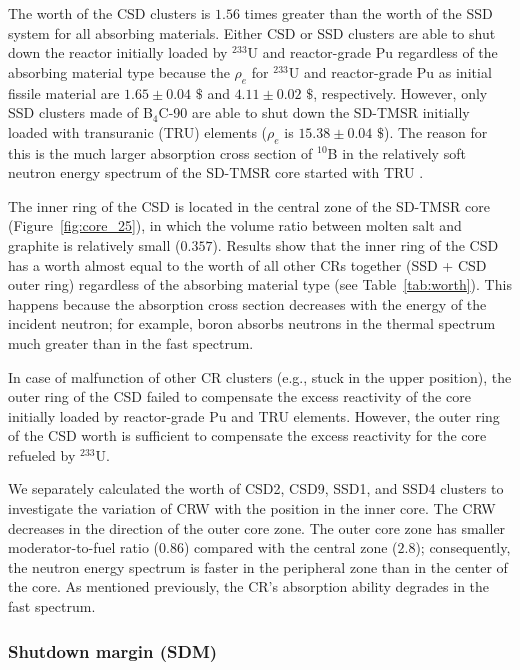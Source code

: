The worth of the CSD clusters is $1.56$ times greater than 
the worth of the SSD system for all absorbing materials. Either CSD or SSD 
clusters are able to shut down the reactor initially loaded by 
$^{233}$U and reactor-grade Pu regardless of the absorbing material type because 
the $\rho_e$ for $^{233}$U and reactor-grade Pu as initial fissile material are $1.65\pm0.04$ 
$\$$ and $4.11\pm0.02$ $\$$, respectively. However, only SSD clusters made of B$_4$C-90 are able to shut down the SD-TMSR 
initially loaded with transuranic (TRU) elements ($\rho_e$ is $15.38\pm0.04$ $\$$). The reason for this is the much larger 
absorption cross section of $^{10}$B in the relatively soft neutron energy 
spectrum of the SD-TMSR core started with TRU \cite{ashraf2020Strategies}.

The inner ring of the CSD is located in the central zone of the SD-TMSR core 
(Figure~\ref{fig:core_25}), in which the volume ratio between molten salt and 
graphite is relatively small ($0.357$). Results show that the inner ring of the CSD has 
a worth almost equal to the worth of all other CRs together (SSD + CSD outer ring) regardless of 
the absorbing material type (see Table~\ref{tab:worth}). This happens because the absorption cross section
decreases with the energy of the incident neutron; for example, boron absorbs neutrons in the thermal spectrum much 
greater than in the fast spectrum.

In case of malfunction of other CR clusters (e.g., stuck in the upper 
position), the outer ring of the CSD failed to compensate the excess 
reactivity of the core initially loaded by reactor-grade Pu and TRU elements. However, the outer ring of the CSD worth is sufficient 
to compensate the excess reactivity for the core refueled by $^{233}$U. 

We separately calculated the worth of CSD2, CSD9, SSD1, and SSD4 clusters to 
investigate the variation of CRW with the position in the inner core.
The CRW decreases in the direction of the outer core zone. The outer core zone 
has smaller moderator-to-fuel ratio ($0.86$) compared with the central zone 
($2.8$); consequently, the neutron energy spectrum is faster in the peripheral 
zone than in the center of the core. As mentioned previously, the CR's 
absorption ability degrades in the fast spectrum.

\subsubsection{Shutdown margin (SDM)}


